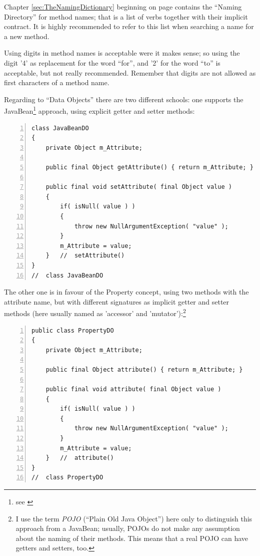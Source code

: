 \documentclass[12pt,a4paper,titlepage, parskip=half, headsepline, footsepline, cleardoubleplain]{scrbook}
\newcommand*{\tqref}[1]{\hyperref[{#1}]{\ref*{#1}}}
\begin{document}
Chapter \tqref{sec:TheNamingDictionary} beginning on page \pageref{sec:TheNamingDictionary} contains the “Naming Directory” for method names; that is a list of verbs together with their implicit contract. It is highly recommended to refer to this list when searching a name for a new method.

Using digits in method names is acceptable were it makes sense; so using the digit '4' as replacement for the word “for”, and '2' for the word “to” is acceptable, but not really recommended. Remember that digits are not allowed as first characters of a method name.

Regarding to “Data Objects” there are two different schools: one supports the JavaBean\footnote{see \autocite{ORACLE_DOC_JAVABEANS}} approach, using explicit getter and setter methods:
\begin{lstlisting}[numbers=left,caption={JavaBean}]
class JavaBeanDO
{
    private Object m_Attribute;

    public final Object getAttribute() { return m_Attribute; }

    public final void setAttribute( final Object value )
    {
        if( isNull( value ) ) 
        {
            throw new NullArgumentException( "value" );
        }
        m_Attribute = value;
    }   //  setAttribute()
}
//  class JavaBeanDO
\end{lstlisting}

The other one is in favour of the Property concept, using two methods with the attribute name, but with different signatures as implicit getter and setter methods (here usually named as 'accessor' and 'mutator'):\footnote{I use the term \textit{POJO} (“Plain Old Java Object”) here only to distinguish this approach from a JavaBean; usually, POJOs do not make any assumption about the naming of their methods. This means that a real POJO can have getters and setters, too.}

\begin{lstlisting}[numbers=left,caption={POJO}]
public class PropertyDO
{
    private Object m_Attribute;

    public final Object attribute() { return m_Attribute; }

    public final void attribute( final Object value )
    {
        if( isNull( value ) ) 
        {
            throw new NullArgumentException( "value" );
        }
        m_Attribute = value;
    }	//	attribute()
}
//  class PropertyDO
\end{lstlisting}
\end{document}
